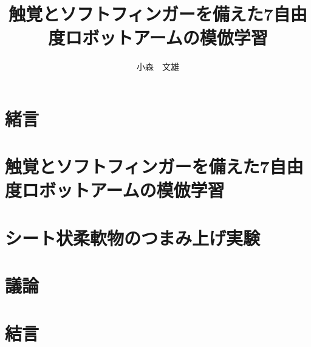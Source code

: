 \documentclass[11pt]{jarticle}
\title{触覚とソフトフィンガーを備えた7自由度ロボットアームの模倣学習}
\author{小森　文雄}
\begin{document}
\setlength{\abovecaptionskip}{0mm}

\titlepage



\newpage
\tableofcontents

\section{緒言}

  
  
\section{触覚とソフトフィンガーを備えた7自由度ロボットアームの模倣学習}

  

\section{シート状柔軟物のつまみ上げ実験}

  

\section{議論}



\section{結言}









\end{document}
